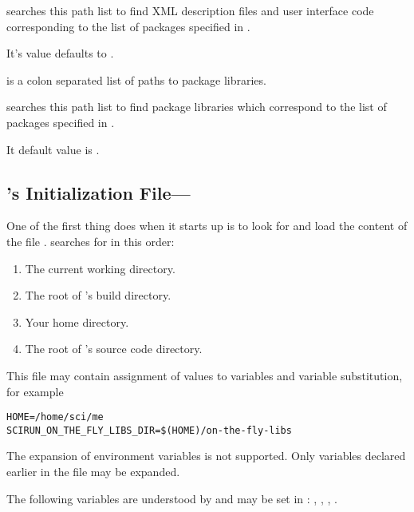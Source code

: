 \begin{description}
  \sr{} searches this path list to find XML description files and
  user interface code corresponding to the list of packages
  specified in .
  
  It's value defaults to .

  
   is a colon separated list of paths to
  package libraries.
  
  \sr{} searches this path list to find package libraries
  which correspond to the list of packages specified in
  .
  
  It default value is .

  
\end{description}

\subsection{\sr{}'s Initialization File---}
\label{sec:scirunrc}

One of the first thing \sr{} does when it starts up is to look for and
load the content of the file .  \sr{} searches for
 in this order:

\begin{enumerate}
\item The current working directory.
\item The root of \sr's build directory.
\item Your home directory.
\item The root of \sr's source code directory.
\end{enumerate}

This file may contain assignment of values to variables and variable
substitution, for example

\begin{verbatim}
HOME=/home/sci/me
SCIRUN_ON_THE_FLY_LIBS_DIR=$(HOME)/on-the-fly-libs
\end{verbatim}

The expansion of environment variables is not supported.  Only
variables declared earlier in the file may be expanded.

The following variables are understood by \sr{} and may be set in
: ,
, ,
.

